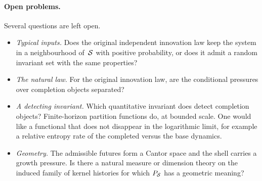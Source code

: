 \paragraph{Open problems.}
Several questions are left open.
\begin{itemize}
  \item \emph{Typical inputs.} Does the original independent innovation law keep the system in a neighbourhood of~$\mathcal{S}$ with positive probability, or does it admit a random invariant set with the same properties?
  \item \emph{The natural law.} For the original innovation law, are the conditional pressures over completion objects separated?
  \item \emph{A detecting invariant.} Which quantitative invariant does detect completion objects? Finite-horizon partition functions do, at bounded scale. One would like a functional that does not disappear in the logarithmic limit, for example a relative entropy rate of the completed versus the base dynamics.
  \item \emph{Geometry.} The admissible futures form a Cantor space and the shell carries a growth pressure. Is there a natural measure or dimension theory on the induced family of kernel histories for which $P_{\mathcal{S}}$ has a geometric meaning?
\end{itemize}
